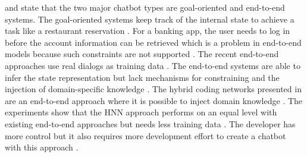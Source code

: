 \citet{williams2017hybrid} and \citet{bordes2016learning} state that the two major chatbot types are goal-oriented and end-to-end systems.
The goal-oriented systems keep track of the internal state to achieve a task like a restaurant reservation \cite{williams2017hybrid}. 
For a banking app, the user needs to log in before the account information can be retrieved 
which is a problem in end-to-end models because such constraints are not supported \cite{williams2017hybrid}.
The recent end-to-end approaches use real dialogs as training data \cite{williams2017hybrid}. 
The end-to-end systems are able to infer the state representation but lack mechanisms 
for constraining and the injection of domain-specific knowledge \cite{williams2017hybrid}.
The hybrid coding networks presented in \citet{williams2017hybrid} are an end-to-end approach 
where it is possible to inject domain knowledge \cite{williams2017hybrid}. 
The experiments show that the HNN approach performs on an equal level with 
existing end-to-end approaches but needs less training data \cite{williams2017hybrid}. The developer 
has more control but it also requires more development effort to create a chatbot with this approach \cite{williams2017hybrid}.

